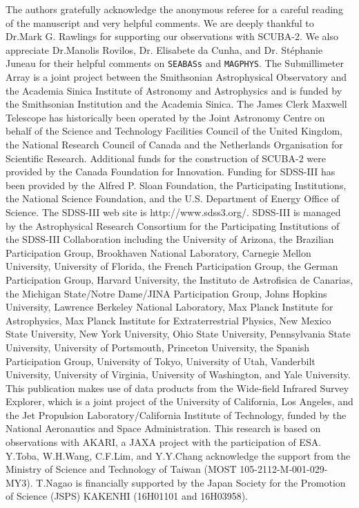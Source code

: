 \documentclass[twocolumn]{aastex6}
\begin{document}
\acknowledgments
The authors gratefully acknowledge the anonymous referee for a careful reading of the manuscript and very helpful comments.
We are deeply thankful to Dr.Mark G. Rawlings for supporting our observations with SCUBA-2.
We also appreciate Dr.Manolis Rovilos, Dr. Elisabete da Cunha, and Dr. St\'ephanie Juneau for their helpful comments on {\tt SEABASs} and {\tt MAGPHYS}.
The Submillimeter Array is a joint project between the Smithsonian Astrophysical Observatory and the Academia Sinica Institute of Astronomy and Astrophysics and is funded by the Smithsonian Institution and the Academia Sinica.
The James Clerk Maxwell Telescope has historically been operated by the Joint Astronomy Centre on behalf of the Science and Technology Facilities Council of the United Kingdom, the National Research Council of Canada and the Netherlands Organisation for Scientific Research.
Additional funds for the construction of SCUBA-2 were provided by the Canada Foundation for Innovation. 
Funding for SDSS-III has been provided by the Alfred P. Sloan Foundation, the Participating Institutions, the National Science Foundation, and the U.S. Department of Energy Office of Science. The SDSS-III web site is http://www.sdss3.org/.
SDSS-III is managed by the Astrophysical Research Consortium for the Participating Institutions of the SDSS-III Collaboration including the University of Arizona, the Brazilian Participation Group, Brookhaven National Laboratory, Carnegie Mellon University, University of Florida, the French Participation Group, the German Participation Group, Harvard University, the Instituto de Astrofisica de Canarias, the Michigan State/Notre Dame/JINA Participation Group, Johns Hopkins University, Lawrence Berkeley National Laboratory, Max Planck Institute for Astrophysics, Max Planck Institute for Extraterrestrial Physics, New Mexico State University, New York University, Ohio State University, Pennsylvania State University, University of Portsmouth, Princeton University, the Spanish Participation Group, University of Tokyo, University of Utah, Vanderbilt University, University of Virginia, University of Washington, and Yale University.
This publication makes use of data products from the Wide-field Infrared Survey Explorer, which is a joint project of the University of California, Los Angeles, and the Jet Propulsion Laboratory/California Institute of Technology, funded by the National Aeronautics and Space Administration. 
This research is based on observations with AKARI, a JAXA project with the participation of ESA.
Y.Toba, W.H.Wang, C.F.Lim, and Y.Y.Chang acknowledge the support from the Ministry of Science and Technology of Taiwan (MOST 105-2112-M-001-029-MY3).
T.Nagao is financially supported by the Japan Society for the Promotion of Science (JSPS) KAKENHI (16H01101 and 16H03958).
\end{document}
